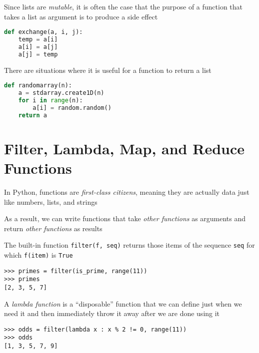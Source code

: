 \documentclass[8pt,a4paper,compress]{beamer}
\begin{document}
\begin{frame}[fragile]
Since lists are \emph{mutable}, it is often the case that the purpose of a function that takes a list as argument is to produce a side effect
\begin{lstlisting}[language=Python]
def exchange(a, i, j):
    temp = a[i]
    a[i] = a[j]
    a[j] = temp
\end{lstlisting}

\bigskip

There are situations where it is useful for a function to return a list
\begin{lstlisting}[language=Python]
def randomarray(n):
    a = stdarray.create1D(n)
    for i in range(n):
        a[i] = random.random()
    return a
\end{lstlisting}
\end{frame}

\section{Filter, Lambda, Map, and Reduce Functions}
\begin{frame}[fragile]
In Python, functions are \emph{first-class citizens}, meaning they are actually data just like numbers, lists, and strings

\bigskip

As a result, we can write functions that take \emph{other functions} as arguments and return \emph{other functions} as results

\bigskip

The built-in function \lstinline{filter(f, seq)} returns those items of the sequence \lstinline{seq} for which \lstinline{f(item)} is \lstinline{True}
\begin{lstlisting}[language={}]
>>> primes = filter(is_prime, range(11))
>>> primes
[2, 3, 5, 7]
\end{lstlisting}

\bigskip

A \emph{lambda function} is a ``disposable'' function that we can define just when we need it and then immediately throw it away after we are done using it
\begin{lstlisting}[language={}]
>>> odds = filter(lambda x : x % 2 != 0, range(11))
>>> odds
[1, 3, 5, 7, 9]
\end{lstlisting}
\end{frame}
\end{document}
